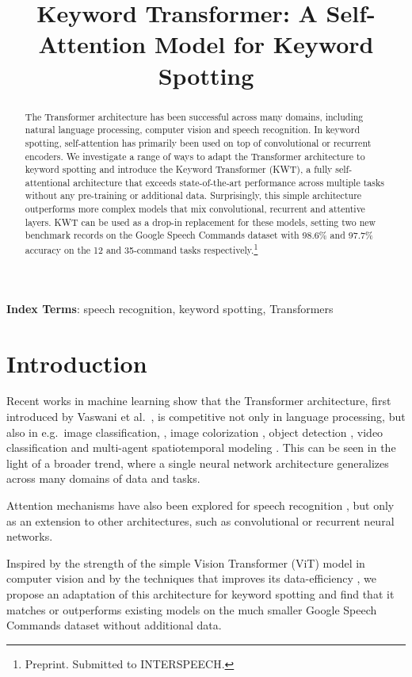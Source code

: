 \documentclass[a4paper]{article}
\title{Keyword Transformer: A Self-Attention Model for Keyword Spotting}
\begin{document}
\maketitle
\begin{abstract}
The Transformer architecture has been successful across many domains, including natural language processing, computer vision and speech recognition. In keyword spotting, self-attention has primarily been used on top of convolutional or recurrent encoders. We investigate a range of ways to adapt the Transformer architecture to keyword spotting and introduce the Keyword Transformer (KWT), a fully self-attentional architecture that exceeds state-of-the-art performance across multiple tasks without any pre-training or additional data. Surprisingly, this simple architecture outperforms more complex models that mix convolutional, recurrent and attentive layers. KWT can be used as a drop-in replacement for these models, setting two new benchmark records on the Google Speech Commands dataset with 98.6\% and 97.7\% accuracy on the 12 and 35-command tasks respectively.\footnote{Preprint. Submitted to INTERSPEECH.}
\end{abstract}
\noindent\textbf{Index Terms}: speech recognition, keyword spotting, Transformers

\section{Introduction}

Recent works in machine learning show that the Transformer architecture, first introduced by Vaswani et al.\ \cite{vaswani2017attention}, is competitive not only in language processing, but also in e.g.\ image classification, \cite{dosovitskiy2020image, touvron2020training, yuan2021tokens}, image colorization \cite{kumar2021colorization}, object detection \cite{carion2020end}, video classification \cite{neimark2021video} and multi-agent spatiotemporal modeling \cite{alcorn2021baller2vec}. This can be seen in the light of a broader trend, where a single neural network architecture generalizes across many domains of data and tasks. 

Attention mechanisms have also been explored for speech recognition \cite{de2018neural, rybakov2020streaming, gulati2020conformer}, but only as an extension to other architectures, such as convolutional or recurrent neural networks.

Inspired by the strength of the simple Vision Transformer (ViT) model \cite{dosovitskiy2020image} in computer vision and by the techniques that improves its data-efficiency \cite{touvron2020training}, we propose an adaptation of this architecture for keyword spotting and find that it matches or outperforms existing models on the much smaller Google Speech Commands dataset \cite{warden2018speech} without additional data.
\end{document}
